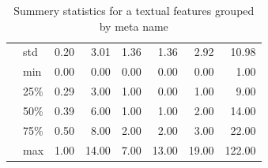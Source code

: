 \begin{table}[h]
\begin{center}
\begin{tabular}{llrrrrrr}
            & std &         0.20 &       3.01 &       1.36 &       1.36 &       2.92 &      10.98 \\
            & min &         0.00 &       0.00 &       0.00 &       0.00 &       0.00 &       1.00 \\
            & 25\% &         0.29 &       3.00 &       1.00 &       0.00 &       1.00 &       9.00 \\
            & 50\% &         0.39 &       6.00 &       1.00 &       1.00 &       2.00 &      14.00 \\
            & 75\% &         0.50 &       8.00 &       2.00 &       2.00 &       3.00 &      22.00 \\
            & max &         1.00 &      14.00 &       7.00 &      13.00 &      19.00 &     122.00 \\
\bottomrule
\end{tabular}

\caption{Summery statistics for a textual features grouped by meta name}
\label{table:textualDistr}
\end{center}
\end{table}      



